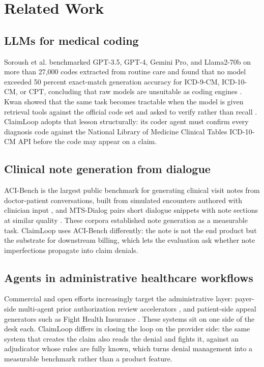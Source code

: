 \documentclass[sigconf,nonacm]{acmart}
\begin{document}
\section{Related Work}

\subsection{LLMs for medical coding}
Soroush et al. benchmarked GPT-3.5, GPT-4, Gemini Pro, and Llama2-70b on more
than 27,000 codes extracted from routine care and found that no model exceeded
50 percent exact-match generation accuracy for ICD-9-CM, ICD-10-CM, or CPT,
concluding that raw models are unsuitable as coding engines
\cite{soroush2024poor}. Kwan showed that the same task becomes tractable when
the model is given retrieval tools against the official code set and asked to
verify rather than recall \cite{kwan2024tools}. ClaimLoop adopts that lesson
structurally: its coder agent must confirm every diagnosis code against the
National Library of Medicine Clinical Tables ICD-10-CM API \cite{nlmct}
before the code may appear on a claim.

\subsection{Clinical note generation from dialogue}
ACI-Bench is the largest public benchmark for generating clinical visit notes
from doctor-patient conversations, built from simulated encounters authored
with clinician input \cite{yim2023acibench}, and MTS-Dialog pairs short
dialogue snippets with note sections at similar quality \cite{abacha2023mts}.
These corpora established note generation as a measurable task. ClaimLoop
uses ACI-Bench differently: the note is not the end product but the substrate
for downstream billing, which lets the evaluation ask whether note
imperfections propagate into claim denials.

\subsection{Agents in administrative healthcare workflows}
Commercial and open efforts increasingly target the administrative layer:
payer-side multi-agent prior authorization review accelerators
\cite{msprior}, and patient-side appeal generators such as Fight Health
Insurance \cite{fhi}. These systems sit on one side of the desk each.
ClaimLoop differs in closing the loop on the provider side: the same system
that creates the claim also reads the denial and fights it, against an
adjudicator whose rules are fully known, which turns denial management into a
measurable benchmark rather than a product feature.
\end{document}
